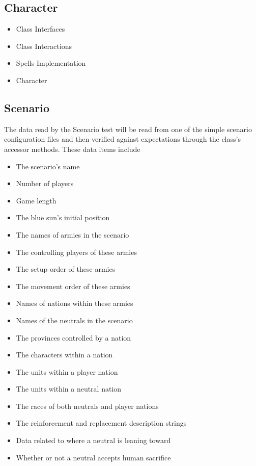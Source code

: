 {\color{black}
\subsection{Character}
\begin{itemize}
\item Class Interfaces
\item Class Interactions
\item Spells Implementation
\item Character 
\end{itemize}

\subsection{Scenario}
The data read by the Scenario test will be read from one of the simple 
scenario configuration files and then verified against expectations through 
the class's accessor methods. These data items include 
\newline
\begin{itemize}
\item The scenario's name
\item Number of players
\item Game length
\item The blue sun's initial position
\item The names of armies in the scenario
\item The controlling players of these armies
\item The setup order of these armies
\item The movement order of these armies
\item Names of nations within these armies
\item Names of the neutrals in the scenario
\item The provinces controlled by a nation
\item The characters within a nation
\item The units within a player nation
\item The units within a neutral nation
\item The races of both neutrals and player nations
\item The reinforcement and replacement description strings
\item Data related to where a neutral is leaning toward
\item Whether or not a neutral accepts human sacrifice
\end{itemize}

}
